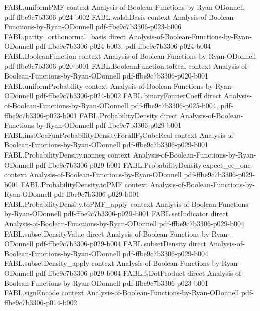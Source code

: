 \begin{theorem}
\proofstep
  {FABL.uniformPMF}
  {context}
  {Analysis-of-Boolean-Functions-by-Ryan-ODonnell}
  {pdf-ffbe9c7b3306-p024-b002}
\proofstep
  {FABL.walshBasis}
  {context}
  {Analysis-of-Boolean-Functions-by-Ryan-ODonnell}
  {pdf-ffbe9c7b3306-p023-b006}
\proofstep
  {FABL.parity_orthonormal_basis}
  {direct}
  {Analysis-of-Boolean-Functions-by-Ryan-ODonnell}
  {pdf-ffbe9c7b3306-p024-b003,
    pdf-ffbe9c7b3306-p024-b004}
\proofstep
  {FABL.BooleanFunction}
  {context}
  {Analysis-of-Boolean-Functions-by-Ryan-ODonnell}
  {pdf-ffbe9c7b3306-p020-b001}
\proofstep
  {FABL.BooleanFunction.toReal}
  {context}
  {Analysis-of-Boolean-Functions-by-Ryan-ODonnell}
  {pdf-ffbe9c7b3306-p020-b001}
\proofstep
  {FABL.uniformProbability}
  {context}
  {Analysis-of-Boolean-Functions-by-Ryan-ODonnell}
  {pdf-ffbe9c7b3306-p024-b002}
\proofstep
  {FABL.binaryFourierCoeff}
  {direct}
  {Analysis-of-Boolean-Functions-by-Ryan-ODonnell}
  {pdf-ffbe9c7b3306-p025-b004,
    pdf-ffbe9c7b3306-p023-b001}
\proofstep
  {FABL.ProbabilityDensity}
  {direct}
  {Analysis-of-Boolean-Functions-by-Ryan-ODonnell}
  {pdf-ffbe9c7b3306-p029-b001}
\proofstep
  {FABL.instCoeFunProbabilityDensityForallF₂CubeReal}
  {context}
  {Analysis-of-Boolean-Functions-by-Ryan-ODonnell}
  {pdf-ffbe9c7b3306-p029-b001}
\proofstep
  {FABL.ProbabilityDensity.nonneg}
  {context}
  {Analysis-of-Boolean-Functions-by-Ryan-ODonnell}
  {pdf-ffbe9c7b3306-p029-b001}
\proofstep
  {FABL.ProbabilityDensity.expect_eq_one}
  {context}
  {Analysis-of-Boolean-Functions-by-Ryan-ODonnell}
  {pdf-ffbe9c7b3306-p029-b001}
\proofstep
  {FABL.ProbabilityDensity.toPMF}
  {context}
  {Analysis-of-Boolean-Functions-by-Ryan-ODonnell}
  {pdf-ffbe9c7b3306-p029-b001}
\proofstep
  {FABL.ProbabilityDensity.toPMF_apply}
  {context}
  {Analysis-of-Boolean-Functions-by-Ryan-ODonnell}
  {pdf-ffbe9c7b3306-p029-b001}
\proofstep
  {FABL.setIndicator}
  {direct}
  {Analysis-of-Boolean-Functions-by-Ryan-ODonnell}
  {pdf-ffbe9c7b3306-p029-b004}
\proofstep
  {FABL.subsetDensityValue}
  {direct}
  {Analysis-of-Boolean-Functions-by-Ryan-ODonnell}
  {pdf-ffbe9c7b3306-p029-b004}
\proofstep
  {FABL.subsetDensity}
  {direct}
  {Analysis-of-Boolean-Functions-by-Ryan-ODonnell}
  {pdf-ffbe9c7b3306-p029-b004}
\proofstep
  {FABL.subsetDensity_apply}
  {context}
  {Analysis-of-Boolean-Functions-by-Ryan-ODonnell}
  {pdf-ffbe9c7b3306-p029-b004}
\proofstep
  {FABL.f₂DotProduct}
  {direct}
  {Analysis-of-Boolean-Functions-by-Ryan-ODonnell}
  {pdf-ffbe9c7b3306-p023-b001}
\proofstep
  {FABL.signEncode}
  {context}
  {Analysis-of-Boolean-Functions-by-Ryan-ODonnell}
  {pdf-ffbe9c7b3306-p014-b002}

\end{theorem}
